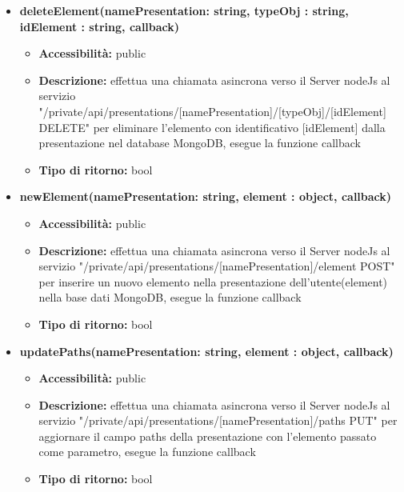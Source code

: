 {\begin{itemize}
		\item \textbf{deleteElement(namePresentation: string, typeObj : string, idElement : string, callback) }
			\begin{itemize}
			\item \textbf{Accessibilit\`{a}:} public
			\item \textbf{Descrizione:} effettua una chiamata asincrona verso il Server nodeJs al servizio "/private/api/presentations/[namePresentation]/[typeObj]/[idElement] DELETE" per eliminare l'elemento con identificativo [idElement] dalla presentazione nel database MongoDB, esegue la funzione callback
			\item \textbf{Tipo di ritorno:} bool
			\end{itemize}
			
		\item \textbf{newElement(namePresentation: string, element : object, callback)}
			\begin{itemize}
			\item \textbf{Accessibilit\`{a}:} public
			\item \textbf{Descrizione:} effettua una chiamata asincrona verso il Server nodeJs al servizio "/private/api/presentations/[namePresentation]/element POST" per inserire un nuovo elemento nella presentazione dell'utente(element) nella base dati MongoDB, esegue la funzione callback
 			\item \textbf{Tipo di ritorno:} bool
			\end{itemize}
			
		\item \textbf{updatePaths(namePresentation: string, element : object, callback) }
			\begin{itemize}
			\item \textbf{Accessibilit\`{a}:} public
			\item \textbf{Descrizione:} effettua una chiamata asincrona verso il Server nodeJs al servizio "/private/api/presentations/[namePresentation]/paths PUT" per aggiornare il campo paths della presentazione con l'elemento passato come parametro, esegue la funzione callback
			\item \textbf{Tipo di ritorno:} bool
			\end{itemize}

		\end{itemize}
	}
	
	
	
	
	
	
	
	
	
	
	
	
	
	
	